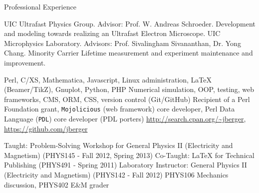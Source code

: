 \begin{rubric}{Professional Experience}


  \entry*[2005 --- \ldots] UIC Ultrafast Physics Group. Advisor: Prof. W. Andreas Schroeder. Development and modeling towards realizing an Ultrafast Electron Microscope.
  \entry*[2003 --- 2005] UIC Microphysics Laboratory. Advisors: Prof. Sivalingham Sivananthan, Dr. Yong Chang. Minority Carrier Lifetime measurement and experiment maintenance and improvement.


  \entry*[Skills] Perl, C/XS, Mathematica, Javascript, Linux administration, \LaTeX{} (Beamer/TikZ), Gnuplot, Python, PHP
  \entry*[Concepts] Numerical simulation, OOP, testing, web frameworks, CMS, ORM, CSS, version control (Git/GitHub)
  \entry*[Affiliations] Recipient of a Perl Foundation grant, \texttt{Mojolicious} (web framework) core developer, Perl Data Language (\texttt{PDL}) core developer (PDL porters)
  \entry*[Code] \url{http://search.cpan.org/~jberger}, \url{https://github.com/jberger}
  

  \entry*[Teaching] Taught: Problem-Solving Workshop for General Physics II (Electricity and Magnetism) (PHYS145 - Fall 2012, Spring 2013) 
  \entry*[Teaching] Co-Taught: \LaTeX{} for Technical Publishing (PHYS491 - Spring 2011)
  \entry*[T.A.] Laboratory Instructor: General Physics II (Electricity and Magnetism) (PHYS142 - Fall 2012)
  \entry*[T.A.] PHYS106 Mechanics discussion, PHYS402 E\&M grader

\end{rubric}
